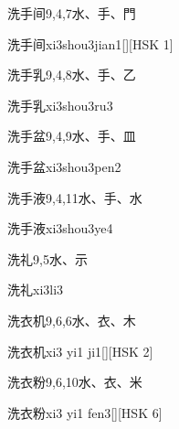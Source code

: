 \begin{Entry}{洗手间}{9,4,7}{⽔、⼿、⾨}
  \begin{Phonetics}{洗手间}{xi3shou3jian1}[][HSK 1]
  \end{Phonetics}
\end{Entry}

\begin{Entry}{洗手乳}{9,4,8}{⽔、⼿、⼄}
  \begin{Phonetics}{洗手乳}{xi3shou3ru3}
  \end{Phonetics}
\end{Entry}

\begin{Entry}{洗手盆}{9,4,9}{⽔、⼿、⽫}
  \begin{Phonetics}{洗手盆}{xi3shou3pen2}
  \end{Phonetics}
\end{Entry}

\begin{Entry}{洗手液}{9,4,11}{⽔、⼿、⽔}
  \begin{Phonetics}{洗手液}{xi3shou3ye4}
  \end{Phonetics}
\end{Entry}

\begin{Entry}{洗礼}{9,5}{⽔、⽰}
  \begin{Phonetics}{洗礼}{xi3li3}
  \end{Phonetics}
\end{Entry}

\begin{Entry}{洗衣机}{9,6,6}{⽔、⾐、⽊}
  \begin{Phonetics}{洗衣机}{xi3 yi1 ji1}[][HSK 2]
  \end{Phonetics}
\end{Entry}

\begin{Entry}{洗衣粉}{9,6,10}{⽔、⾐、⽶}
  \begin{Phonetics}{洗衣粉}{xi3 yi1 fen3}[][HSK 6]
  \end{Phonetics}
\end{Entry}

